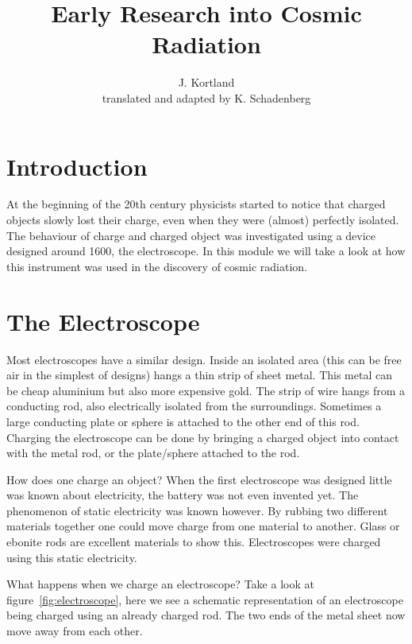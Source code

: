 \documentclass[12pt,a4paper]{article}
\author{J. Kortland \\ translated and adapted by K. Schadenberg}
\date{}
\title{Early Research into Cosmic Radiation}
\numberwithin{equation}{section}
\numberwithin{figure}{section}
\numberwithin{table}{section}
\begin{document}
\maketitle

\section{Introduction}
At the beginning of the 20th century physicists started to notice that charged objects slowly lost their charge, even when they were (almost) perfectly isolated. The behaviour of charge and charged object was investigated using a device designed around 1600, the electroscope. In this module we will take a look at how this instrument was used in the discovery of cosmic radiation.

\section{The Electroscope}
Most electroscopes have a similar design. Inside an isolated area (this can be free air in the simplest of designs) hangs a thin strip of sheet metal. This metal can be cheap aluminium but also more expensive gold. The strip of wire hangs from a conducting rod, also electrically isolated from the surroundings. Sometimes a large conducting plate or sphere is attached to the other end of this rod. Charging the electroscope can be done by bringing a charged object into contact with the metal rod, or the plate/sphere attached to the rod.

How does one charge an object? When the first electroscope was designed little was known about electricity, the battery was not even invented yet. The phenomenon of static electricity was known however. By rubbing two different materials together one could move charge from one material to another. Glass or ebonite rods are excellent materials to show this. Electroscopes were charged using this static electricity.

What happens when we charge an electroscope? Take a look at figure~\ref{fig:electroscope}, here we see a schematic representation of an electroscope being charged using an already charged rod. The two ends of the metal sheet now move away from each other.
\end{document}

